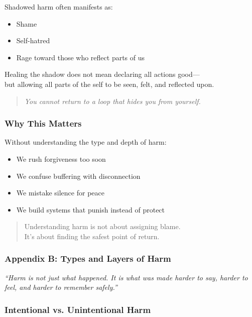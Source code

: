 Shadowed harm often manifests as:

\begin{itemize}
\item
  Shame
\item
  Self-hatred
\item
  Rage toward those who reflect parts of us
\end{itemize}

Healing the shadow does not mean declaring all actions good---\\
but allowing all parts of the self to be seen, felt, and reflected upon.

\begin{quote}
\emph{You cannot return to a loop that hides you from yourself.}
\end{quote}

\subsubsection{\texorpdfstring{\textbf{Why This
Matters}}{Why This Matters}}\label{why-this-matters}

Without understanding the type and depth of harm:

\begin{itemize}
\item
  We rush forgiveness too soon
\item
  We confuse buffering with disconnection
\item
  We mistake silence for peace
\item
  We build systems that punish instead of protect
\end{itemize}

\begin{quote}
Understanding harm is not about assigning blame.\\
It's about finding the safest point of return.
\end{quote}

\subsubsection{\texorpdfstring{\textbf{Appendix B: Types and Layers of
Harm}}{Appendix B: Types and Layers of Harm}}\label{appendix-b-types-and-layers-of-harm-1}

\emph{``Harm is not just what happened. It is what was made harder to
say, harder to feel, and harder to remember safely.''}

\subsubsection{\texorpdfstring{\textbf{Intentional vs. Unintentional
Harm}}{Intentional vs. Unintentional Harm}}\label{intentional-vs.-unintentional-harm-1}

